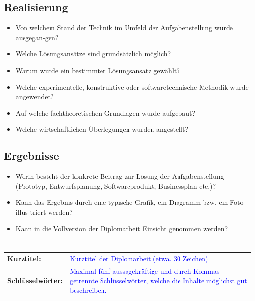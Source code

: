 \documentclass{article}
\begin{document}
\subsection*{Realisierung}
\begin{itemize}
    \item Von welchem Stand der Technik im Umfeld der Aufgabenstellung wurde ausgegan-gen?
    \item Welche Lösungsansätze sind grundsätzlich möglich?
    \item Warum wurde ein bestimmter Lösungsansatz gewählt?
    \item Welche experimentelle, konstruktive oder softwaretechnische Methodik wurde angewendet?
    \item Auf welche fachtheoretischen Grundlagen wurde aufgebaut?
    \item Welche wirtschaftlichen Überlegungen wurden angestellt?
\end{itemize}

\subsection*{Ergebnisse}
\begin{itemize}
    \item Worin besteht der konkrete Beitrag zur Lösung der Aufgabenstellung (Prototyp, Entwurfsplanung, Softwareprodukt, Businessplan etc.)?
    \item Kann das Ergebnis durch eine typische Grafik, ein Diagramm bzw. ein Foto illus-triert werden?
    \item Kann in die Vollversion der Diplomarbeit Einsicht genommen werden?
\end{itemize}

\color{black}
\vspace*{\fill}
\section*{}

\bgroup
    \def\arraystretch{1.5}
    \begin{tabular}{p{48mm}p{113mm}}
        \textbf{Kurztitel:} & \textcolor{blue}{Kurztitel der Diplomarbeit (etwa. 30 Zeichen)}\\
        \textbf{Schlüsselwörter:} & \textcolor{blue}{Maximal fünf aussagekräftige und durch Kommas getrennte Schlüsselwörter, welche die Inhalte möglichst gut beschreiben.}
    \end{tabular}
\egroup
\end{document}
